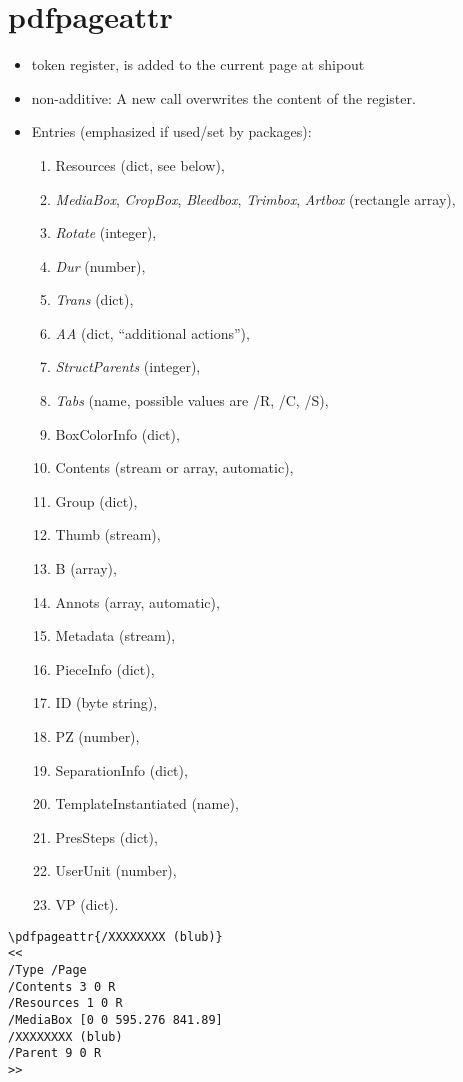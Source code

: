 \documentclass{article}
\begin{document}
\section{pdfpageattr}
\begin{itemize}
\item token register, is added to the current page at shipout
\item non-additive: A new call overwrites the content of the register.
\item Entries (emphasized if used/set by packages):
   \begin{enumerate}
    \item Resources (dict, see below),
    \item \emph{MediaBox}, \emph{CropBox}, \emph{Bleedbox}, \emph{Trimbox}, \emph{Artbox} (rectangle array),
    \item \emph{Rotate} (integer),
    \item \emph{Dur} (number),
    \item \emph{Trans} (dict),
    \item \emph{AA} (dict, \enquote{additional actions}),
    \item \emph{StructParents} (integer),
    \item \emph{Tabs} (name, possible values are /R, /C, /S),
    \item BoxColorInfo (dict),
    \item Contents (stream or array, automatic),
    \item Group (dict),
    \item Thumb (stream),
    \item B (array),
    \item Annots (array, automatic),
    \item Metadata (stream),
    \item PieceInfo (dict),
    \item ID (byte string),
    \item PZ (number),
    \item SeparationInfo (dict),
    \item TemplateInstantiated (name),
    \item  PresSteps (dict),
    \item UserUnit (number),
    \item VP (dict).
    \end{enumerate}
   \end{itemize}
\begin{verbatim}
\pdfpageattr{/XXXXXXXX (blub)}
<<
/Type /Page
/Contents 3 0 R
/Resources 1 0 R
/MediaBox [0 0 595.276 841.89]
/XXXXXXXX (blub)
/Parent 9 0 R
>>
\end{verbatim}
\end{document}
